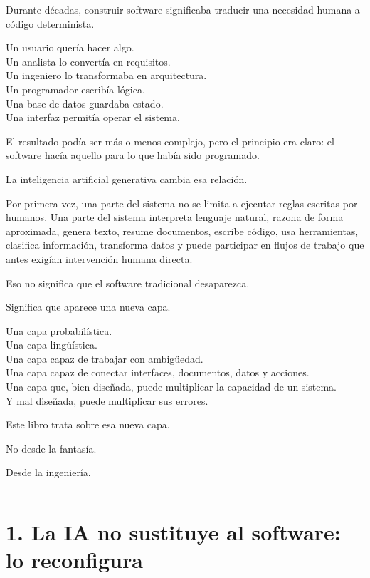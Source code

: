 Durante décadas, construir software significaba traducir una necesidad
humana a código determinista.

Un usuario quería hacer algo.\\
Un analista lo convertía en requisitos.\\
Un ingeniero lo transformaba en arquitectura.\\
Un programador escribía lógica.\\
Una base de datos guardaba estado.\\
Una interfaz permitía operar el sistema.

El resultado podía ser más o menos complejo, pero el principio era
claro: el software hacía aquello para lo que había sido programado.

La inteligencia artificial generativa cambia esa relación.

Por primera vez, una parte del sistema no se limita a ejecutar reglas
escritas por humanos. Una parte del sistema interpreta lenguaje natural,
razona de forma aproximada, genera texto, resume documentos, escribe
código, usa herramientas, clasifica información, transforma datos y
puede participar en flujos de trabajo que antes exigían intervención
humana directa.

Eso no significa que el software tradicional desaparezca.

Significa que aparece una nueva capa.

Una capa probabilística.\\
Una capa lingüística.\\
Una capa capaz de trabajar con ambigüedad.\\
Una capa capaz de conectar interfaces, documentos, datos y acciones.\\
Una capa que, bien diseñada, puede multiplicar la capacidad de un
sistema.\\
Y mal diseñada, puede multiplicar sus errores.

Este libro trata sobre esa nueva capa.

No desde la fantasía.

Desde la ingeniería.

\begin{center}\rule{0.5\linewidth}{0.5pt}\end{center}

\section{1. La IA no sustituye al software: lo
reconfigura}\label{la-ia-no-sustituye-al-software-lo-reconfigura}

